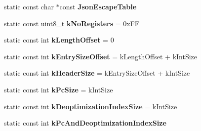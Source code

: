 \begin{DoxyCompactItemize}
\item 
static const char $\ast$const {\bfseries Json\+Escape\+Table}\hypertarget{classv8_1_1internal_1_1_b_a_s_e___e_m_b_e_d_d_e_d_a02e47f470b7f4efbfbaa5c3da7cd1169}{}\label{classv8_1_1internal_1_1_b_a_s_e___e_m_b_e_d_d_e_d_a02e47f470b7f4efbfbaa5c3da7cd1169}

\item 
static const uint8\+\_\+t {\bfseries k\+No\+Registers} = 0x\+FF\hypertarget{classv8_1_1internal_1_1_b_a_s_e___e_m_b_e_d_d_e_d_ab20ddd5138d41af728c26dd0abd26bcc}{}\label{classv8_1_1internal_1_1_b_a_s_e___e_m_b_e_d_d_e_d_ab20ddd5138d41af728c26dd0abd26bcc}

\item 
static const int {\bfseries k\+Length\+Offset} = 0\hypertarget{classv8_1_1internal_1_1_b_a_s_e___e_m_b_e_d_d_e_d_a6b4f83366f909fd28ca5150da43ab6b8}{}\label{classv8_1_1internal_1_1_b_a_s_e___e_m_b_e_d_d_e_d_a6b4f83366f909fd28ca5150da43ab6b8}

\item 
static const int {\bfseries k\+Entry\+Size\+Offset} = k\+Length\+Offset + k\+Int\+Size\hypertarget{classv8_1_1internal_1_1_b_a_s_e___e_m_b_e_d_d_e_d_aa7af567a71d0eead736cc11a1a429d59}{}\label{classv8_1_1internal_1_1_b_a_s_e___e_m_b_e_d_d_e_d_aa7af567a71d0eead736cc11a1a429d59}

\item 
static const int {\bfseries k\+Header\+Size} = k\+Entry\+Size\+Offset + k\+Int\+Size\hypertarget{classv8_1_1internal_1_1_b_a_s_e___e_m_b_e_d_d_e_d_abcc8b8be1bb045b4b2e1fe57e4eed1e7}{}\label{classv8_1_1internal_1_1_b_a_s_e___e_m_b_e_d_d_e_d_abcc8b8be1bb045b4b2e1fe57e4eed1e7}

\item 
static const int {\bfseries k\+Pc\+Size} = k\+Int\+Size\hypertarget{classv8_1_1internal_1_1_b_a_s_e___e_m_b_e_d_d_e_d_aa5417a13fcfa9c41729c8d73867a9fc6}{}\label{classv8_1_1internal_1_1_b_a_s_e___e_m_b_e_d_d_e_d_aa5417a13fcfa9c41729c8d73867a9fc6}

\item 
static const int {\bfseries k\+Deoptimization\+Index\+Size} = k\+Int\+Size\hypertarget{classv8_1_1internal_1_1_b_a_s_e___e_m_b_e_d_d_e_d_a6ff73b3a9cab2e87b8c8b1db0ff354d9}{}\label{classv8_1_1internal_1_1_b_a_s_e___e_m_b_e_d_d_e_d_a6ff73b3a9cab2e87b8c8b1db0ff354d9}

\item 
static const int {\bfseries k\+Pc\+And\+Deoptimization\+Index\+Size}
\end{DoxyCompactItemize}
